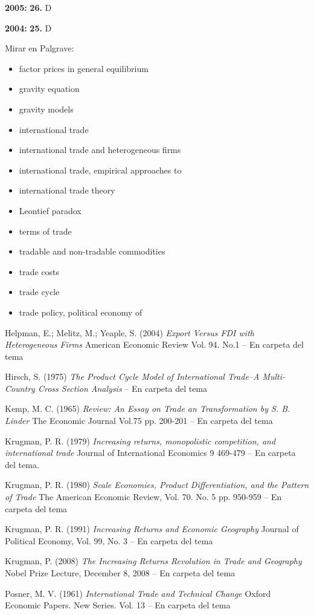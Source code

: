 \documentclass{nuevotema}
\begin{document}
\textbf{2005:} \textbf{26.} D

\textbf{2004:} \textbf{25.} D

\bibliografia

Mirar en Palgrave:
\begin{itemize}
	\item factor prices in general equilibrium
	\item gravity equation
	\item gravity models
	\item international trade
	\item international trade and heterogeneous firms
	\item international trade, empirical approaches to
	\item international trade theory
	\item Leontief paradox
	\item terms of trade
	\item tradable and non-tradable commodities
	\item trade costs
	\item trade cycle
	\item trade policy, political economy of
\end{itemize}

Helpman, E.; Melitz, M.; Yeaple, S. (2004) \textit{Export Versus FDI with Heterogeneous Firms} American Economic Review Vol. 94. No.1 -- En carpeta del tema

Hirsch, S. (1975) \textit{The Product Cycle Model of International Trade--A Multi-Country Cross Section Analysis} -- En carpeta del tema

Kemp, M. C. (1965) \textit{Review: An Essay on Trade an Transformation by S. B. Linder} {The Economic Journal} Vol.75 pp. 200-201 -- En carpeta del tema

Krugman, P. R. (1979) \textit{Increasing returns, monopolistic competition, and international trade} Journal of International Economics 9 469-479 -- En carpeta del tema.

Krugman, P. R. (1980) \textit{Scale Economies, Product Differentiation, and the Pattern of Trade} The American Economic Review, Vol. 70. No. 5 pp. 950-959 -- En carpeta del tema

Krugman, P. R. (1991) \textit{Increasing Returns and Economic Geography} Journal of Political Economy, Vol. 99, No. 3 -- En carpeta del tema

Krugman, P. (2008) \textit{The Increasing Returns Revolution in Trade and Geography} Nobel Prize Lecture, December 8, 2008 -- En carpeta del tema

Posner, M. V. (1961) \textit{International Trade and Technical Change} Oxford Economic Papers. New Series. Vol. 13 -- En carpeta del tema
\end{document}
